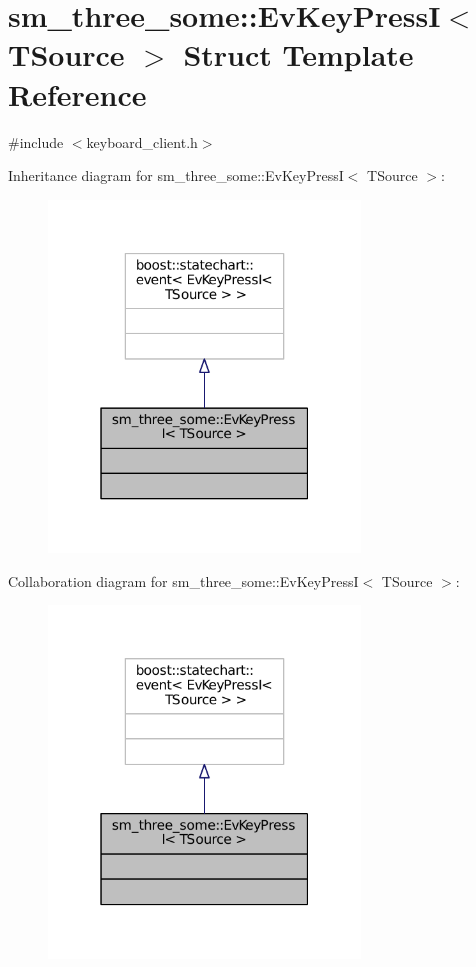 \hypertarget{structsm__three__some_1_1EvKeyPressI}{}\section{sm\+\_\+three\+\_\+some\+:\+:Ev\+Key\+PressI$<$ T\+Source $>$ Struct Template Reference}
\label{structsm__three__some_1_1EvKeyPressI}


{\ttfamily \#include $<$keyboard\+\_\+client.\+h$>$}



Inheritance diagram for sm\+\_\+three\+\_\+some\+:\+:Ev\+Key\+PressI$<$ T\+Source $>$\+:
\nopagebreak
\begin{figure}[H]
\begin{center}
\leavevmode
\includegraphics[width=235pt]{structsm__three__some_1_1EvKeyPressI__inherit__graph}
\end{center}
\end{figure}


Collaboration diagram for sm\+\_\+three\+\_\+some\+:\+:Ev\+Key\+PressI$<$ T\+Source $>$\+:
\nopagebreak
\begin{figure}[H]
\begin{center}
\leavevmode
\includegraphics[width=235pt]{structsm__three__some_1_1EvKeyPressI__coll__graph}
\end{center}
\end{figure}


